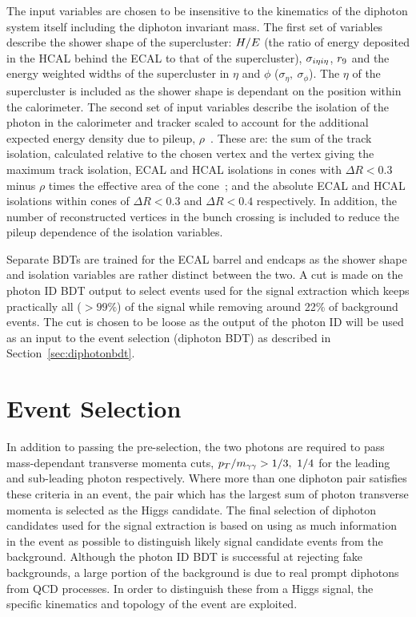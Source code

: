 The input variables are chosen to be insensitive to the kinematics of the diphoton system itself
including the diphoton invariant mass. The first set of variables describe the shower shape of the 
supercluster: $H/E$ (the ratio of energy deposited in the HCAL behind the ECAL to that of the supercluster), 
$\sigma_{i\eta i\eta}$, $r_{9}$ and the energy weighted widths of the supercluster in
$\eta$ and $\phi$ ($\sigma_{\eta},~\sigma_{\phi}$). The $\eta$ of the supercluster is 
included as the shower shape is dependant on the position within the calorimeter. 
The second set of input variables describe the
isolation of the photon in the calorimeter and tracker scaled to account for 
the additional expected energy density due to pileup, $\rho$~\citep{2011JInst611002C}. 
These are: the sum of the track isolation, 
calculated relative to the chosen vertex and the vertex giving the maximum track isolation,
ECAL and HCAL isolations in cones with $\Delta R<0.3$ minus $\rho$ times the effective area 
of the cone~\citep{2011JInst611002C}; 
and the absolute ECAL and HCAL isolations within cones of $\Delta R <0.3$ and $\Delta R<0.4$ 
respectively. In addition, the number of reconstructed vertices in the bunch crossing is included
to reduce the pileup dependence of the isolation variables. 

Separate BDTs are trained for the ECAL barrel and endcaps as the shower
shape and isolation variables are rather distinct between the two. 
A cut is made on the photon ID BDT output to select events used for the signal extraction which
keeps practically all ($>99\%$) of the signal while removing around 22\% of background events.
The cut is chosen to be loose as the output of the photon ID will be used as an input to the 
event selection (diphoton BDT) as described in Section~\ref{sec:diphotonbdt}. 

\section{Event Selection}
\label{sec:eventselection}

In addition to passing the pre-selection, the two photons are required to pass mass-dependant transverse 
momenta cuts, $p_{T}/m_{\gamma\gamma} > 1/3, ~1/4$ for the leading and sub-leading photon respectively.
Where more than one diphoton pair satisfies these criteria in an event, the pair which has the largest
sum of photon transverse momenta is selected as the Higgs candidate.
The final selection of diphoton candidates used for the signal extraction is based on using as much information 
in the event as possible to distinguish likely signal candidate events from the background. Although the 
photon ID BDT is successful at rejecting fake backgrounds, a large portion of the background is due to
real prompt diphotons from QCD processes. In order to distinguish these from a Higgs signal, 
the specific kinematics and topology of the event are exploited.

